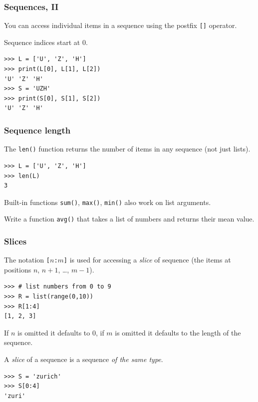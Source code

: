 \documentclass[english,serif,mathserif,xcolor=pdftex,dvipsnames,table]{beamer}
\begin{document}
\begin{frame}
  \frametitle{Sequences, II}
  You can access individual items in a sequence using the postfix
  \texttt{[]} operator.

  \+
  Sequence indices start at 0.

\begin{lstlisting}
>>> L = ['U', 'Z', 'H']
>>> print(L[0], L[1], L[2])
'U' 'Z' 'H'
>>> S = 'UZH'
>>> print(S[0], S[1], S[2])
'U' 'Z' 'H'
\end{lstlisting}
\end{frame}


\begin{frame}[fragile]
  \frametitle{Sequence length}
The \texttt{len()} function returns the number of items in any
  sequence (not just lists).
\begin{lstlisting}
>>> L = ['U', 'Z', 'H']
>>> len(L)
3
\end{lstlisting}

  \+ Built-in functions \lstinline|sum()|, \lstinline|max()|, \lstinline|min()|
  also work on list arguments.
\end{frame}


\begin{frame}
  \begin{exercise*}[3.A]
    Write a function \texttt{avg()} that takes a list of numbers and returns
    their mean value.
  \end{exercise*}
\end{frame}


\begin{frame}[fragile]
  \frametitle{Slices}
  The notation \texttt{[$n$:$m$]} is used for accessing a \emph{slice}
  of sequence (the items at positions $n$, $n+1$, \ldots, $m-1$).

\begin{lstlisting}
>>> # list numbers from 0 to 9
>>> R = list(range(0,10))
>>> R[1:4]
[1, 2, 3]
\end{lstlisting}

  \+
  If $n$ is omitted it defaults to 0, if $m$ is omitted it defaults to
  the length of the sequence.

  \+ A \textit{slice} of a sequence is a sequence \textit{of the same
  type}.
\begin{lstlisting}
>>> S = 'zurich'
>>> S[0:4]
'zuri'
\end{lstlisting}
\end{frame}
\end{document}
